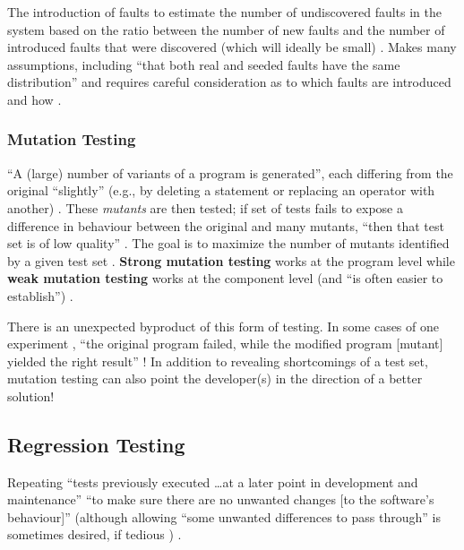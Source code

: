 The introduction of faults to estimate the number of undiscovered faults in the
system based on the ratio between the number of new faults and the number of
introduced faults that were discovered (which will ideally be small)
\cite[p.~427]{van_vliet_software_2000}. Makes many assumptions, including
``that both real and seeded faults have the same distribution'' and requires
careful consideration as to which faults are introduced and how
\cite[p.~427]{van_vliet_software_2000}.

\subsubsection{Mutation Testing \cite[pp.~428-429]{van_vliet_software_2000}}

``A (large) number of variants of a program is generated'', each differing from
the original ``slightly'' (e.g., by deleting a statement or replacing an
operator with another) \cite[p.~428]{van_vliet_software_2000}. These
\emph{mutants} are then tested; if set of tests fails to expose a difference in
behaviour between the original and many mutants, ``then that test set is of low
quality'' \cite[pp.~428-429]{van_vliet_software_2000}. The goal is to maximize
the number of mutants identified by a given test set
\cite[p.~429]{van_vliet_software_2000}. \textbf{Strong mutation testing} works
at the program level while \textbf{weak mutation testing} works at the
component level (and ``is often easier to establish'')
\cite[p.~429]{van_vliet_software_2000}.

There is an unexpected byproduct of this form of testing. In some cases of one
experiment , ``the original program failed,
while the modified program [mutant] yielded the right result''
\cite[p.~432]{van_vliet_software_2000}! In addition to revealing shortcomings
of a test set, mutation testing can also point the developer(s) in the
direction of a better solution!

\subsection{Regression Testing}

Repeating ``tests previously executed \dots at a later point in development and
maintenance'' \cite[p.~446]{peters_software_2000} ``to make sure there are no
unwanted changes [to the software's behaviour]'' (although allowing ``some
unwanted differences to pass through'' is sometimes desired, if tedious
\cite[p.~482]{peters_software_2000}) \cite[p.~481]{peters_software_2000}.

